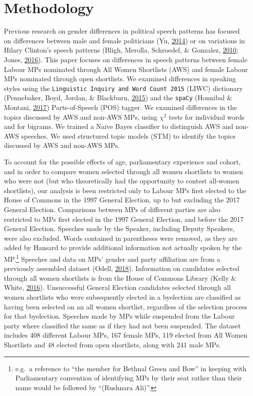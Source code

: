 \documentclass[]{article}
\let\rmarkdownfootnote\footnote%
\def\footnote{\protect\rmarkdownfootnote}
\theoremstyle{definition}
\theoremstyle{definition}
\theoremstyle{definition}
\theoremstyle{remark}
\begin{document}
\hypertarget{methodology}{%
\section{Methodology}\label{methodology}}

Previous research on gender differences in political speech patterns has
focused on differences between male and female politicians (Yu,
\protect\hyperlink{ref-yu2014}{2014}) or on variations in Hilary
Clinton's speech patterns (Bligh, Merolla, Schroedel, \& Gonzalez,
\protect\hyperlink{ref-bligh2010}{2010}; Jones,
\protect\hyperlink{ref-jones2016}{2016}). This paper focuses on
differences in speech patterns between female Labour MPs nominated
through All Women Shortlists (AWS) and female Labour MPs nominated
through open shortlists. We examined differences in speaking styles
using the \texttt{Linguistic\ Inquiry\ and\ Word\ Count\ 2015} (LIWC)
dictionary (Pennebaker, Boyd, Jordan, \& Blackburn,
\protect\hyperlink{ref-pennebaker2015}{2015}) and the \texttt{spaCy}
(Honnibal \& Montani, \protect\hyperlink{ref-honnibal2017}{2017})
Parts-of-Speech (POS) tagger. We examined differences in the topics
discussed by AWS and non-AWS MPs, using \({\chi}^2\) tests for
individual words and for bigrams. We trained a Naive Bayes classifier to
distinguish AWS and non-AWS speeches. We used structured topic models
(STM) to identify the topics discussed by AWS and non-AWS MPs.

To account for the possible effects of age, parliamentary experience and
cohort, and in order to compare women selected through all women
shortlists to women who were not (but who theoretically had the
opportunity to contest all-women shortlists), our analysis is been
restricted only to Labour MPs first elected to the House of Commons in
the 1997 General Election, up to but excluding the 2017 General
Election. Comparisons between MPs of different parties are also
restricted to MPs first elected in the 1997 General Election, and before
the 2017 General Election. Speeches made by the Speaker, including
Deputy Speakers, were also excluded. Words contained in parentheses were
removed, as they are added by Hansard to provide additional information
not actually spoken by the MP.\footnote{e.g.~a reference to ``the member
  for Bethnal Green and Bow'' in keeping with Parliamentary convention
  of identifying MPs by their seat rather than their name would be
  followed by ``(Rushnara Ali)''.} Speeches and data on MPs' gender and
party affiliation are from a previously assembled dataset (Odell,
\protect\hyperlink{ref-odell2018}{2018}). Information on candidates
selected through all women shortlists is from the House of Commons
Library (Kelly \& White, \protect\hyperlink{ref-kelly2016}{2016}).
Unsuccessful General Election candidates selected through all women
shortlists who were subsequently elected in a byelection are classified
as having been selected on an all women shortlist, regardless of the
selection process for that byelection. Speeches made by MPs while
suspended from the Labour party where classified the same as if they had
not been suspended. The dataset includes 408 different Labour MPs, 167
female MPs, 119 elected from All Women Shortlists and 48 elected from
open shortlists, along with 241 male MPs.
\end{document}
